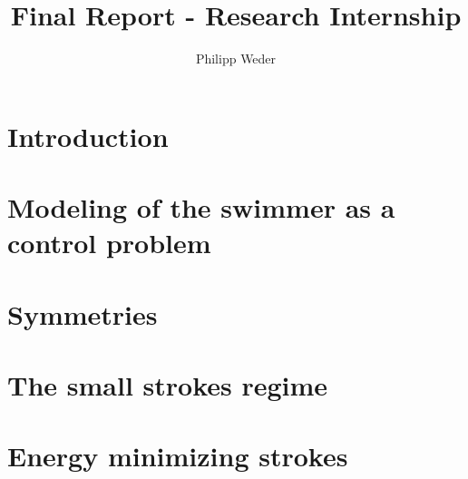 \documentclass[10pt,a4paper]{article}
\author{Philipp Weder}
\title{\textbf{Final Report - Research Internship}}
\date{}
\numberwithin{equation}{section}
\theoremstyle{plain}
\theoremstyle{plain}
\theoremstyle{plain}
\theoremstyle{remark}
\theoremstyle{definition}
\theoremstyle{definition}
\theoremstyle{plain}
\theoremstyle{plain}
\begin{document}
\maketitle

\section{Introduction}


\section[Modeling]{Modeling of the swimmer as a control problem}


\section{Symmetries}


\section[The small strokes regime]{The small strokes regime}


\section{Energy minimizing strokes}



\printbibliography
\end{document}
